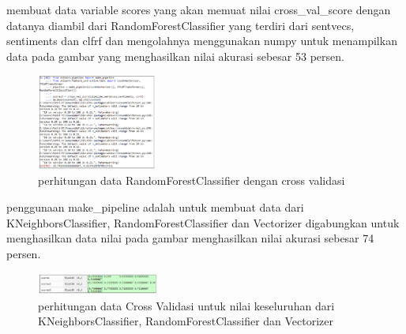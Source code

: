 \begin{enumerate}
        \subitem membuat data variable scores yang akan memuat nilai cross\_val\_score dengan datanya diambil dari RandomForestClassifier yang terdiri dari sentvecs, sentiments dan clfrf dan mengolahnya menggunakan numpy untuk menampilkan data pada gambar yang menghasilkan nilai akurasi sebesar 53 persen. 
        \begin{figure}[H]
            \includegraphics[width=4cm]{figures/1174040/chapter5/34.png}
            \centering
            \caption{perhitungan data  RandomForestClassifier dengan cross validasi}
        \end{figure}
        
        \subitem penggunaan make\_pipeline adalah untuk membuat data dari KNeighborsClassifier, RandomForestClassifier dan Vectorizer digabungkan untuk menghasilkan data nilai pada gambar menghasilkan nilai akurasi sebesar 74 persen. 
        \begin{figure}[H]
            \includegraphics[width=4cm]{figures/1174040/chapter5/35.png}
            \centering
            \caption{perhitungan data Cross Validasi untuk nilai keseluruhan dari KNeighborsClassifier, RandomForestClassifier dan Vectorizer}
        \end{figure}
        
        \end{enumerate}